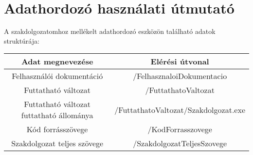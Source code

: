 \chapter*{Adathordozó használati útmutató}


\noindent A szakdolgozatomhoz mellékelt adathordozó eszközön található adatok struktúrája:

\begin{center}
  \begin{tabular}{ | c | c | }
    \hline
      Adat megnevezése & Elérési útvonal \\ \hline
      Felhasználói dokumentáció &  /FelhasznaloiDokumentacio\\ \hline
      Futtatható változat & /FuttathatoValtozat  \\ \hline
      Futtatható változat futtatható állománya & /FuttathatoValtozat/Szakdolgozat.exe  \\ \hline
      Kód forrásszövege & /KodForrasszovege  \\ \hline
      Szakdolgozat teljes szövege & /SzakdolgozatTeljesSzovege  \\ \hline
  \end{tabular}
\end{center}

